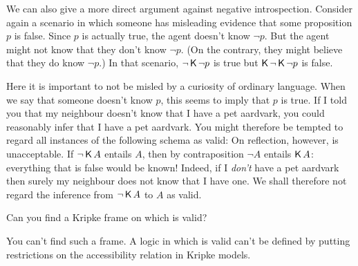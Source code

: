 We can also give a more direct argument against negative introspection. Consider
again a scenario in which someone has misleading evidence that some proposition
$p$ is false. Since $p$ is actually true, the agent doesn't know $\neg p$. But
the agent might not know that they don't know $\neg p$. (On the contrary, they
might believe that they do know $\neg p$.) In that scenario, $\neg\operatorname{\mathsf{K}{}} \neg p$ is
true but $\operatorname{\mathsf{K}{}} \neg \operatorname{\mathsf{K}{}} \neg p$ is false.

Here it is important to not be misled by a curiosity of ordinary language. When
we say that someone doesn't know $p$, this seems to imply that $p$ is true. If I
told you that my neighbour doesn't know that I have a pet aardvark, you could
reasonably infer that I have a pet aardvark. You might therefore be tempted to
regard all instances of the following schema as valid:
%
%
On reflection, however,  is unacceptable. If $\neg \operatorname{\mathsf{K}{}} A$ entails $A$,
then by contraposition $\neg A$ entails $\operatorname{\mathsf{K}{}} A$: everything that is false would
be known! Indeed, if I \emph{don't} have a pet aardvark then surely my neighbour
does not know that I have one. We shall therefore not regard the inference from
$\neg \operatorname{\mathsf{K}{}} A$ to $A$ as valid.

\begin{exercise}
  Can you find a Kripke frame on which  is valid?
\end{exercise}
\begin{solution}
  You can't find such a frame. A logic in which  is valid can't be
  defined by putting restrictions on the accessibility relation in Kripke
  models.
\end{solution}

